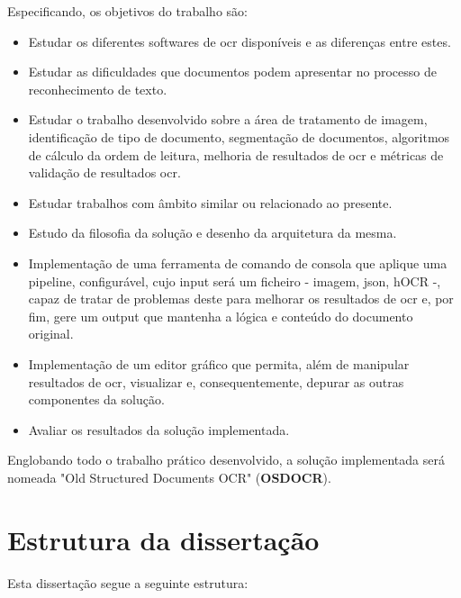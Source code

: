 Especificando, os objetivos do trabalho são:
\begin{itemize}\setlength\itemsep{-0.5em}
    \item Estudar os diferentes softwares de \acrshort{ocr} disponíveis e as diferenças entre estes.
    \item Estudar as dificuldades que documentos podem apresentar no processo de reconhecimento de texto.
    \item Estudar o trabalho desenvolvido sobre a área de tratamento de imagem, identificação de tipo de documento, segmentação de documentos, algoritmos de cálculo da ordem de leitura, melhoria de resultados de \acrshort{ocr} e métricas de validação de resultados \acrshort{ocr}.
    \item Estudar trabalhos com âmbito similar ou relacionado ao presente.
    \item Estudo da filosofia da solução e desenho da arquitetura da mesma.
    \item Implementação de uma ferramenta de comando de consola que aplique uma pipeline, configurável, cujo input será um ficheiro - imagem, json, hOCR -, capaz de tratar de problemas deste para melhorar os resultados de \acrshort{ocr} e, por fim, gere um output que mantenha a lógica e conteúdo do documento original.
    \item Implementação de um editor gráfico que permita, além de manipular resultados de \acrshort{ocr}, visualizar e, consequentemente, depurar as outras componentes da solução.
    \item Avaliar os resultados da solução implementada.
\end{itemize}

Englobando todo o trabalho prático desenvolvido, a solução implementada será nomeada "Old Structured Documents OCR" (\textbf{OSDOCR}).



\section{Estrutura da dissertação}

Esta dissertação segue a seguinte estrutura:

